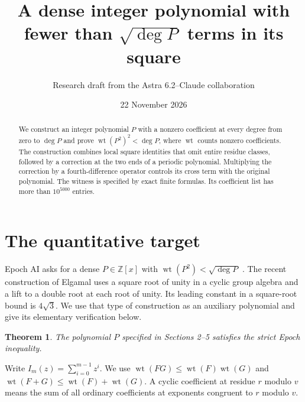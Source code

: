 \documentclass[11pt]{article}
\title{A dense integer polynomial with fewer than $\sqrt{\deg P}$ terms in its square}
\author{Research draft from the Astra 6.2--Claude collaboration}
\date{22 November 2026}
\newcommand{\wt}{\operatorname{wt}}
\newcommand{\Z}{\mathbb Z}
\newtheorem{theorem}{Theorem}
\begin{document}
\maketitle
\begin{abstract}
We construct an integer polynomial $P$ with a nonzero coefficient at every degree from zero to $\deg P$ and prove $\wt(P^2)^2<\deg P$, where $\wt$ counts nonzero coefficients. The construction combines local square identities that omit entire residue classes, followed by a correction at the two ends of a periodic polynomial. Multiplying the correction by a fourth-difference operator controls its cross term with the original polynomial. The witness is specified by exact finite formulas. Its coefficient list has more than $10^{5000}$ entries.
\end{abstract}
\section{The quantitative target}
Epoch AI asks for a dense $P\in\Z[x]$ with $\wt(P^2)<\sqrt{\deg P}$ \cite{epoch}. The recent construction of Elgamal \cite{elgamal} uses a square root of unity in a cyclic group algebra and a lift to a double root at each root of unity. Its leading constant in a square-root bound is $4\sqrt 3$. We use that type of construction as an auxiliary polynomial and give its elementary verification below.
\begin{theorem}\label{thm}
The polynomial $P$ specified in Sections 2--5 satisfies the strict Epoch inequality.
\end{theorem}
Write $I_m(z)=\sum_{i=0}^{m-1}z^i$. We use $\wt(FG)\leq\wt(F)\wt(G)$ and $\wt(F+G)\leq\wt(F)+\wt(G)$. A cyclic coefficient at residue $r$ modulo $v$ means the sum of all ordinary coefficients at exponents congruent to $r$ modulo $v$.
\end{document}
